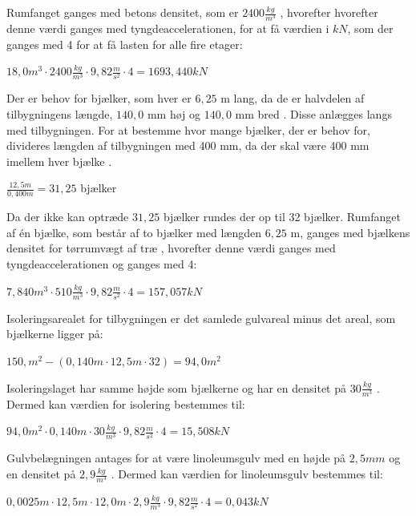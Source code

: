 Rumfanget ganges med betons densitet, som er $2400 \frac{kg}{m^3}$ \citep{betonsdensitet}, hvorefter hvorefter denne værdi ganges med tyngdeaccelerationen, for at få værdien i $kN$, som der ganges med 4 for at få lasten for alle fire etager:
\begin{center}
	$18,\!0 m^3\cdot 2400 \frac{kg}{m^3}\cdot 9,82 \frac{m}{s^2}\cdot 4=1693,440 kN$
\end{center}

Der er behov for bjælker, som hver er $6,\!25$ m lang, da de er halvdelen af tilbygningens længde, $140,\!0$ mm høj og $140,\!0$ mm bred \citep{granse}. Disse anlægges langs med tilbygningen. For at bestemme hvor mange bjælker, der er behov for, divideres længden af tilbygningen med 400 mm, da der skal være 400 mm imellem hver bjælke \citep{Gulvopbygning}. 

\begin{center}
	$\frac{12,\!5 m}{0,\!400 m}=31,\!25$ bjælker
\end{center} 

Da der ikke kan optræde $31,\!25$ bjælker rundes der op til 32 bjælker.
\newline
\newline
Rumfanget af én bjælke, som består af to bjælker med længden $6,\!25$ m, ganges med bjælkens densitet for tørrumvægt af træ \citep{torrumvagt}, hvorefter denne værdi ganges med tyngdeaccelerationen og ganges med 4: 
\begin{center}
	$7,\!840 m^3\cdot 510 \frac{kg}{m^3}\cdot 9,\!82 \frac{m}{s^2}\cdot 4=157,\!057 kN$
\end{center}

Isoleringsarealet for tilbygningen er det samlede gulvareal minus det areal, som bjælkerne ligger på:
\begin{center}
	$150,\! m^2 - (0,\!140 m\cdot 12,\!5 m\cdot 32)=94,\!0 m^2$
\end{center}

Isoleringslaget har samme højde som bjælkerne og har en densitet på $30 \frac{kg}{m^3}$ \citep{densitet}. Dermed kan værdien for isolering bestemmes til:
\begin{center}
	$94,\!0 m^2\cdot 0,\!140 m\cdot 30 \frac{kg}{m^3}\cdot 9,\!82 \frac{m}{s^2}\cdot 4=15,\!508 kN$
\end{center}

Gulvbelægningen antages for at være linoleumsgulv med en højde på $2,\!5 mm$ og en densitet på $2,\!9 \frac{kg}{m^3}$ \citep{linoleum}. 
Dermed kan værdien for linoleumsgulv bestemmes til:
\begin{center}
	$0,\!0025 m\cdot 12,\!5 m\cdot 12,\!0 m\cdot 2,\!9 \frac{kg}{m^3}\cdot 9,\!82 \frac{m}{s^2}\cdot 4=0,\!043 kN$
\end{center}

